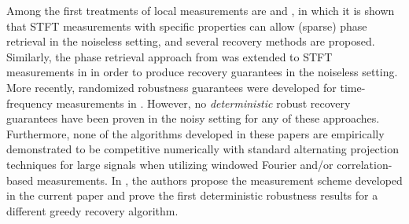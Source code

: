 Among the first treatments of local measurements are \cite{eldar2014sparse,BendoryE16} and \cite{jaganathan2015stft}, in which it is shown that STFT measurements with specific properties can allow (sparse) phase retrieval in the noiseless setting, and several recovery methods are proposed.  Similarly, the phase retrieval approach from \cite{alexeev2014phase} was extended to STFT measurements in \cite{salanevich2015polarization} in order to produce recovery guarantees in the noiseless setting.  More recently, randomized robustness guarantees were developed for time-frequency measurements in \cite{pfander2016robust}.  However, no {\it deterministic} robust recovery guarantees have been proven in the noisy setting for any of these approaches.  Furthermore, none of the algorithms developed in these papers are empirically demonstrated to be competitive numerically with standard alternating projection techniques for large signals when utilizing windowed Fourier and/or correlation-based measurements.  In \cite{IVW2015_FastPhase}, the authors propose the measurement scheme developed in the current paper and prove the first deterministic robustness results for a different greedy recovery algorithm.





